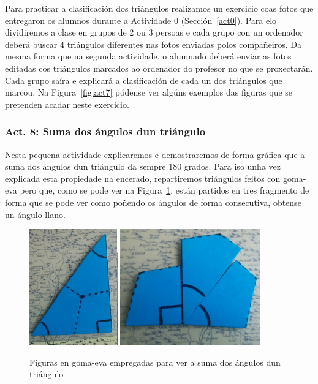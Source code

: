 Para practicar a clasificación dos triángulos realizamos un exercicio coas fotos que entregaron os alumnos durante a Actividade 0 (Sección~\ref{act0}). Para elo dividiremos a clase en grupos de 2 ou 3 persoas e cada grupo con un ordenador deberá buscar 4 triángulos diferentes nas fotos enviadas polos compañeiros. Da mesma forma que na segunda actividade, o alumnado deberá enviar as fotos editadas cos triángulos marcados ao ordenador do profesor no que se proxectarán. Cada grupo saíra e explicará a clasificación de cada un dos triángulos que marcou. Na Figura~\ref{fig:act7} pódense ver algúns exemplos das figuras que se pretenden acadar neste exercicio.

\subsubsection{Act. 8: Suma dos ángulos dun triángulo}\label{sec:sumang}
Nesta pequena actividade explicaremos e demostraremos de forma gráfica que a suma dos ángulos dun triángulo da sempre 180 grados. Para iso unha vez explicada esta propiedade na encerado, repartiremos triángulos feitos con goma-eva pero que, como se pode ver na Figura~\ref{fig:act11}, están partidos en tres fragmento de forma que se pode ver como poñendo os ángulos de forma consecutiva, obtense un ángulo llano.

\begin{figure}[h!]
  \centering
  \includegraphics[height=5cm]{img/180grados-2.png}
  \includegraphics[height=5cm]{img/180grados-1.png}
  \caption{Figuras en goma-eva empregadas para ver a suma dos ángulos dun triángulo}\label{fig:act11}
\end{figure}


